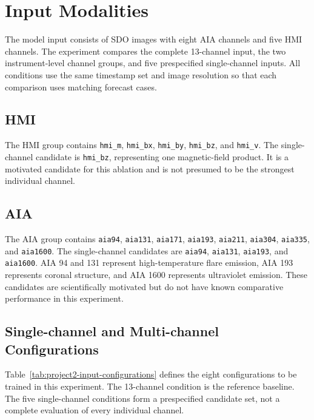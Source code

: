 \documentclass[12pt]{report}
\begin{document}
\section{Input Modalities}

The model input consists of SDO images with eight AIA channels and five HMI channels. The experiment compares the complete 13-channel input, the two instrument-level channel groups, and five prespecified single-channel inputs. All conditions use the same timestamp set and image resolution so that each comparison uses matching forecast cases.

\subsection{HMI}

The HMI group contains \texttt{hmi\_m}, \texttt{hmi\_bx}, \texttt{hmi\_by}, \texttt{hmi\_bz}, and \texttt{hmi\_v}. The single-channel candidate is \texttt{hmi\_bz}, representing one magnetic-field product. It is a motivated candidate for this ablation and is not presumed to be the strongest individual channel.
\subsection{AIA}

The AIA group contains \texttt{aia94}, \texttt{aia131}, \texttt{aia171}, \texttt{aia193}, \texttt{aia211}, \texttt{aia304}, \texttt{aia335}, and \texttt{aia1600}. The single-channel candidates are \texttt{aia94}, \texttt{aia131}, \texttt{aia193}, and \texttt{aia1600}. AIA 94 and 131 represent high-temperature flare emission, AIA 193 represents coronal structure, and AIA 1600 represents ultraviolet emission. These candidates are scientifically motivated but do not have known comparative performance in this experiment.
\subsection{Single-channel and Multi-channel Configurations}

Table~\ref{tab:project2-input-configurations} defines the eight configurations to be trained in this experiment. The 13-channel condition is the reference baseline. The five single-channel conditions form a prespecified candidate set, not a complete evaluation of every individual channel.
\end{document}
